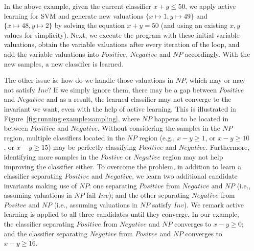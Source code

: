 \begin{example}
In the above example, given the current classifier $x+y \leq 50$, we apply active learning for SVM and generate new valuations $\{x \mapsto 1, y \mapsto 49\}$ and $\{x \mapsto 48, y \mapsto 2\}$ by solving the equation $x+y=50$ (and using an existing $x, y$ values for simplicity). Next, we execute the program with these initial variable valuations, obtain the variable valuations after every iteration of the loop, and add the variable valuations into $Positive$, $Negative$ and $NP$ accordingly. With the new samples, a new classifier is learned.
\end{example}
The other issue is: how do we handle those valuations in $NP$, which may or may not satisfy $Inv$? If we simply ignore them, there may be a gap between $Positive$ and $Negative$ and as a result, the learned classifier may not converge to the invariant we want, even with the help of active learning. This is illustrated in Figure~\ref{fig:running:example:sampling}, where $NP$ happens to be located in between $Positive$ and $Negative$. Without considering the samples in the $NP$ region, multiple classifiers located in the $NP$ region (e.g., $x - y \geq 1$, or $x - y \geq 10$, or $x - y \geq 15$) may be perfectly classifying $Positive$ and $Negative$. Furthermore, identifying more samples in the $Postive$ or $Negative$ region may not help improving the classifier either. To overcome the problem, in addition to learn a classifier separating $Positive$ and $Negative$, we learn two additional candidate invariants making use of $NP$: one separating $Positive$ from $Negative$ and $NP$ (i.e., assuming valuations in $NP$ fail $Inv$); and the other separating $Negative$ from $Positve$ and $NP$ (i.e., assuming valuations in $NP$ satisfy $Inv$). We remark active learning is applied to all three candidates until they converge. In our example, the classifier separating $Positive$ from $Negative$ and $NP$ converges to $x - y \geq 0$; and the classifier separating $Negative$ from $Positve$ and $NP$ converges to $x - y \geq 16$.

